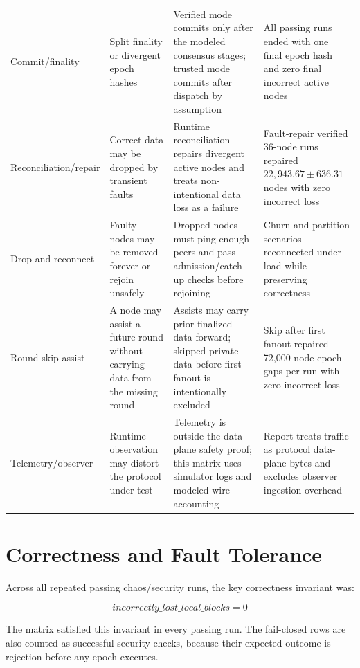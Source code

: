 \documentclass[11pt]{article}
\begin{document}
\begin{longtable}{p{}p{}p{}p{}}
Commit/finality & Split finality or divergent epoch hashes & Verified mode commits only after the modeled consensus stages; trusted mode commits after dispatch by assumption & All passing runs ended with one final epoch hash and zero final incorrect active nodes \\
Reconciliation/repair & Correct data may be dropped by transient faults & Runtime reconciliation repairs divergent active nodes and treats non-intentional data loss as a failure & Fault-repair verified 36-node runs repaired \(22{,}943.67\pm636.31\) nodes with zero incorrect loss \\
Drop and reconnect & Faulty nodes may be removed forever or rejoin unsafely & Dropped nodes must ping enough peers and pass admission/catch-up checks before rejoining & Churn and partition scenarios reconnected under load while preserving correctness \\
Round skip assist & A node may assist a future round without carrying data from the missing round & Assists may carry prior finalized data forward; skipped private data before first fanout is intentionally excluded & Skip after first fanout repaired 72,000 node-epoch gaps per run with zero incorrect loss \\
Telemetry/observer & Runtime observation may distort the protocol under test & Telemetry is outside the data-plane safety proof; this matrix uses simulator logs and modeled wire accounting & Report treats traffic as protocol data-plane bytes and excludes observer ingestion overhead \\
\bottomrule
\end{longtable}

\section{Correctness and Fault Tolerance}

Across all repeated passing chaos/security runs, the key correctness invariant
was:

\[
incorrectly\_lost\_local\_blocks = 0
\]

The matrix satisfied this invariant in every passing run. The fail-closed rows
are also counted as successful security checks, because their expected outcome
is rejection before any epoch executes.
\end{document}
